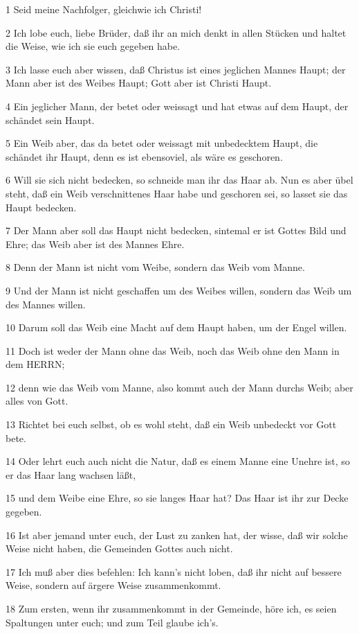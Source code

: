\par 1 Seid meine Nachfolger, gleichwie ich Christi!
\par 2 Ich lobe euch, liebe Brüder, daß ihr an mich denkt in allen Stücken und haltet die Weise, wie ich sie euch gegeben habe.
\par 3 Ich lasse euch aber wissen, daß Christus ist eines jeglichen Mannes Haupt; der Mann aber ist des Weibes Haupt; Gott aber ist Christi Haupt.
\par 4 Ein jeglicher Mann, der betet oder weissagt und hat etwas auf dem Haupt, der schändet sein Haupt.
\par 5 Ein Weib aber, das da betet oder weissagt mit unbedecktem Haupt, die schändet ihr Haupt, denn es ist ebensoviel, als wäre es geschoren.
\par 6 Will sie sich nicht bedecken, so schneide man ihr das Haar ab. Nun es aber übel steht, daß ein Weib verschnittenes Haar habe und geschoren sei, so lasset sie das Haupt bedecken.
\par 7 Der Mann aber soll das Haupt nicht bedecken, sintemal er ist Gottes Bild und Ehre; das Weib aber ist des Mannes Ehre.
\par 8 Denn der Mann ist nicht vom Weibe, sondern das Weib vom Manne.
\par 9 Und der Mann ist nicht geschaffen um des Weibes willen, sondern das Weib um des Mannes willen.
\par 10 Darum soll das Weib eine Macht auf dem Haupt haben, um der Engel willen.
\par 11 Doch ist weder der Mann ohne das Weib, noch das Weib ohne den Mann in dem HERRN;
\par 12 denn wie das Weib vom Manne, also kommt auch der Mann durchs Weib; aber alles von Gott.
\par 13 Richtet bei euch selbst, ob es wohl steht, daß ein Weib unbedeckt vor Gott bete.
\par 14 Oder lehrt euch auch nicht die Natur, daß es einem Manne eine Unehre ist, so er das Haar lang wachsen läßt,
\par 15 und dem Weibe eine Ehre, so sie langes Haar hat? Das Haar ist ihr zur Decke gegeben.
\par 16 Ist aber jemand unter euch, der Lust zu zanken hat, der wisse, daß wir solche Weise nicht haben, die Gemeinden Gottes auch nicht.
\par 17 Ich muß aber dies befehlen: Ich kann's nicht loben, daß ihr nicht auf bessere Weise, sondern auf ärgere Weise zusammenkommt.
\par 18 Zum ersten, wenn ihr zusammenkommt in der Gemeinde, höre ich, es seien Spaltungen unter euch; und zum Teil glaube ich's.
